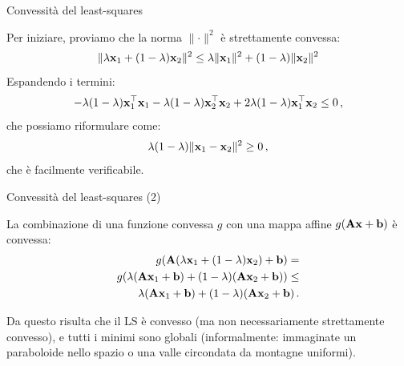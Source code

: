 \documentclass[12pt,aspectratio=169]{beamer}
\begin{document}
\begin{frame}{Convessità del least-squares}
	
	Per iniziare, proviamo che la norma $\lVert \cdot \rVert^2$ è strettamente convessa:
	\begin{equation}
		\lVert \lambda \boldsymbol{\mathbf{\mathbf{x}}}_1 + (1 - \lambda)\boldsymbol{\mathbf{x}}_2 \rVert^2 \le \lambda \lVert\boldsymbol{\mathbf{\boldsymbol{\mathbf{x}}}}_1\rVert^2 + (1 - \lambda)\lVert\boldsymbol{\mathbf{\mathbf{x}}}_2\rVert^2
	\end{equation}
	Espandendo i termini:
	\begin{equation}
		-\lambda(1-\lambda)\boldsymbol{\mathbf{\mathbf{x}}}_1^\top\boldsymbol{\mathbf{x}}_1 - \lambda(1-\lambda)\boldsymbol{\mathbf{\mathbf{x}}}_2^\top\boldsymbol{\mathbf{\mathbf{x}}}_2 + 2 \lambda(1-\lambda)\boldsymbol{\mathbf{\mathbf{x}}}_1^\top\boldsymbol{\mathbf{\mathbf{x}}}_2 \le 0 \,,
	\end{equation}
	che possiamo riformulare come:
	\begin{equation}
		\lambda(1-\lambda)\lVert \boldsymbol{\mathbf{\mathbf{x}}}_1 - \boldsymbol{\mathbf{x}}_2 \rVert^2 \ge 0 \,,
	\end{equation}
	che è facilmente verificabile.
	
\end{frame}


\begin{frame}{Convessità del least-squares (2)}
	
	La combinazione di una funzione convessa $g$ con una mappa affine $g(\boldsymbol{\mathbf{A}}\boldsymbol{\mathbf{x}} + \boldsymbol{\mathbf{b}})$ è convessa:
	\begin{align}
		g(\boldsymbol{\mathbf{A}}(\lambda \boldsymbol{\mathbf{x}}_1 + (1-\lambda)\boldsymbol{\mathbf{x}}_2) + \boldsymbol{\mathbf{b}}) = \nonumber\\ g(\lambda(\boldsymbol{\mathbf{A}}\boldsymbol{\mathbf{x}}_1 + \boldsymbol{\mathbf{b}}) + (1-\lambda)(\boldsymbol{\mathbf{A}}\boldsymbol{\mathbf{x}}_2 + \boldsymbol{\mathbf{b}})) \le \nonumber\\ \lambda(\boldsymbol{\mathbf{A}}\boldsymbol{\mathbf{x}}_1 + \boldsymbol{\mathbf{b}}) + (1-\lambda)(\boldsymbol{\mathbf{A}}\boldsymbol{\mathbf{x}}_2 + \boldsymbol{\mathbf{b}}) \,.
	\end{align}
	
	Da questo risulta che il LS è convesso (ma non necessariamente strettamente convesso), e tutti i minimi sono globali (informalmente: immaginate un paraboloide nello spazio o una valle circondata da montagne uniformi).
	
\end{frame}
\end{document}
